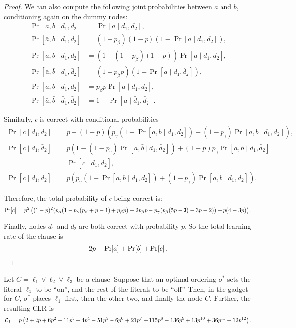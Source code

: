 \begin{proof}
    We can also compute the following joint probabilities between $a$ and $b$, conditioning again on the dummy nodes: 
    \begin{align*}
        \Pr[a,b \mid d_1, d_2] &= \Pr[a \mid d_1, d_2],\\
        \Pr[\bar a, \bar b \mid d_1, d_2] &= (1-p_\beta)(1-p)(1-\Pr[a \mid d_1, d_2]),\\
        \Pr[a,b \mid d_1, \bar d_2] &= (1 - (1-p_\beta)(1-p)) \Pr[a \mid d_1, \bar d_2],\\
        \Pr[\bar a, \bar b \mid d_1, \bar d_2] &= (1-p_\beta p)(1-\Pr[a \mid d_1, \bar d_2]),\\
        \Pr[a,b \mid \bar d_1, \bar d_2] &= p_\beta p \Pr[a \mid \bar d_1, \bar d_2],\\
        \Pr[\bar a, \bar b \mid \bar d_1, \bar d_2] &= 1-\Pr[a \mid \bar d_1, \bar d_2].
    \end{align*}
    
    Similarly, $c$ is correct with conditional probabilities 
    \begin{align*}
        \Pr[c \mid d_1, d_2] &= p + (1-p)(p_\gamma(1-\Pr[\bar a, \bar b \mid d_1, d_2]) + (1-p_\gamma)\Pr[a, b \mid d_1, d_2]), \\
        \Pr[c \mid d_1, \bar d_2] &= p(1-(1-p_\gamma)\Pr[\bar a, \bar b \mid d_1, \bar d_2]) + (1-p) p_\gamma \Pr[a, b \mid d_1, \bar d_2] \\
        & = \Pr[c \mid \bar d_1, d_2], \\
        \Pr[c \mid \bar d_1, \bar d_2] &= p(p_\gamma(1-\Pr[\bar a, \bar b \mid \bar d_1, \bar d_2]) + (1-p_\gamma)\Pr[a, b \mid \bar d_1, \bar d_2]).
    \end{align*}
    
    Therefore, the total probability of $c$ being correct is: \[
	\Pr\!\left[ c \right] = p^2 \left((1-p)^2 (p_\alpha(1-{p_\gamma} ({p_\beta}+p-1)+{p_\beta} p)+ 2p_\beta p -{p_\gamma}({p_\beta} (5 p-3)-3 p-2)) + p(4-3p)\right).
    \]
    
    Finally, nodes $ d_1 $ and $ d_2 $ are both correct with probability $ p $.
    So the total learning rate of the clause is \begin{align*}
	2p + \Pr\!\left[ a \right] + \Pr\!\left[ b \right] + \Pr\!\left[ c \right].
    \end{align*}
\end{proof}

\begin{lemma}\label{lemma:100CLR} 
    Let $C=\ell_1 \lor \ell_2 \lor \ell_3$ be a clause.
    Suppose that an optimal ordering $\sigma^*$ sets the literal $\ell_1$ to be ``on'', and the rest of the literals to be ``off''.
    Then, in the gadget for $C$, $\sigma^*$ places $\ell_1$ first, then the other two, and finally the node $C$.
    Further, the resulting CLR is \[
        \mathcal{L}_1 = p \left(2 + 2 p + 6 p^2 + 11 p^3 + 4 p^4 - 51 p^5 - 6 p^6 + 21 p^7 + 
   115 p^8 - 136 p^9 + 13 p^{10} + 36 p^{11} - 12 p^{12} \right).
    \]
\end{lemma}

